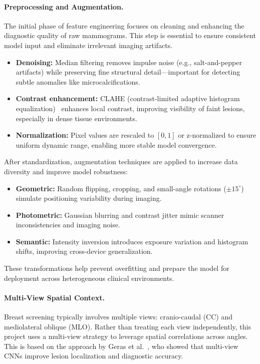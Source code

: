 \documentclass[12pt]{article}
\begin{document}
\paragraph{Preprocessing and Augmentation.}
The initial phase of feature engineering focuses on cleaning and enhancing the diagnostic quality of raw mammograms. This step is essential to ensure consistent model input and eliminate irrelevant imaging artifacts.

\begin{itemize}
    \item \textbf{Denoising:} Median filtering removes impulse noise (e.g., salt-and-pepper artifacts) while preserving fine structural detail—important for detecting subtle anomalies like microcalcifications.
    \item \textbf{Contrast enhancement:} CLAHE (contrast-limited adaptive histogram equalization)~\cite{14} enhances local contrast, improving visibility of faint lesions, especially in dense tissue environments.
    \item \textbf{Normalization:} Pixel values are rescaled to $[0,1]$ or z-normalized to ensure uniform dynamic range, enabling more stable model convergence.
\end{itemize}

After standardization, augmentation techniques are applied to increase data diversity and improve model robustness:

\begin{itemize}
    \item \textbf{Geometric:} Random flipping, cropping, and small-angle rotations ($\pm15^{\circ}$) simulate positioning variability during imaging.
    \item \textbf{Photometric:} Gaussian blurring and contrast jitter mimic scanner inconsistencies and imaging noise.
    \item \textbf{Semantic:} Intensity inversion introduces exposure variation and histogram shifts, improving cross-device generalization.
\end{itemize}

These transformations help prevent overfitting and prepare the model for deployment across heterogeneous clinical environments.

\paragraph{Multi-View Spatial Context.}
Breast screening typically involves multiple views: cranio-caudal (CC) and mediolateral oblique (MLO). Rather than treating each view independently, this project uses a multi-view strategy to leverage spatial correlations across angles. This is based on the approach by Geras et al.~\cite{8}, who showed that multi-view CNNs improve lesion localization and diagnostic accuracy.
\end{document}
